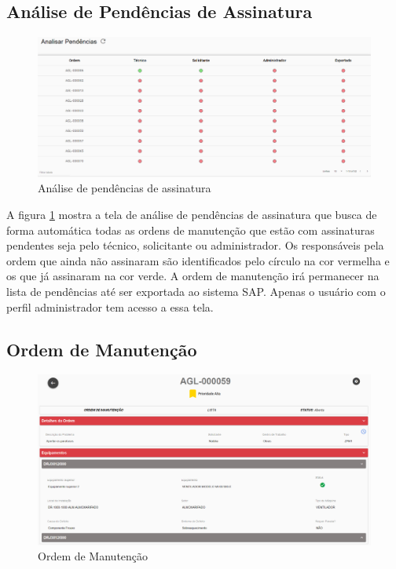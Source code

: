 \subsection{Análise de Pendências de Assinatura}

\begin{figure}[H]
	\caption{\label{web-pendencias}Análise de pendências de assinatura}
	\begin{center}
		\includegraphics[scale=0.34]{./Figuras/agil.it/web-pendencias.png}
	\end{center}
\end{figure}

A figura \ref{web-pendencias} mostra a tela de análise de pendências de assinatura que busca de forma automática todas as ordens de manutenção que estão com assinaturas pendentes seja pelo técnico, solicitante ou administrador. Os responsáveis pela ordem que ainda não assinaram são identificados pelo círculo na cor vermelha e os que já assinaram na cor verde. A ordem de manutenção irá permanecer na lista de pendências até ser exportada ao sistema SAP.
Apenas o usuário com o perfil administrador tem acesso a essa tela.

\subsection{Ordem de Manutenção}

\begin{figure}[H]
	\caption{\label{web-om}Ordem de Manutenção}
	\begin{center}
		\includegraphics[scale=0.34]{./Figuras/agil.it/web-om.png}
	\end{center}
\end{figure}

